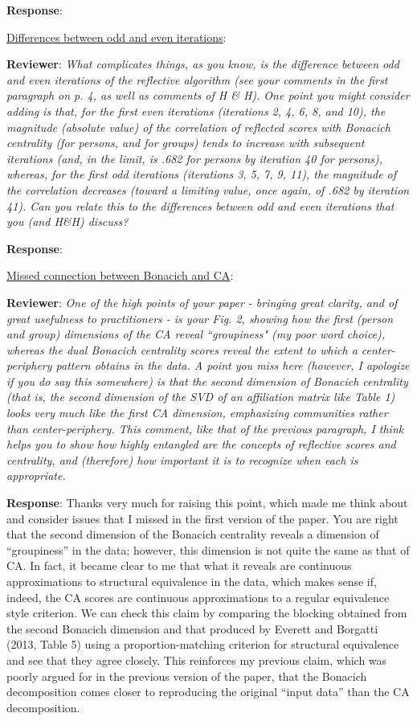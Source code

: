 \documentclass{article}
\begin{document}
\textbf{Response}:

\underline{Differences between odd and even iterations}:

\textbf{Reviewer}: \textit{What complicates things, as you know, is the difference between odd and even iterations of the reflective algorithm (see your comments in the first paragraph on p. 4, as well as comments of H \& H). One point you might consider adding is that, for the first even iterations (iterations 2, 4, 6, 8, and 10), the magnitude (absolute value) of the correlation of reflected scores with Bonacich centrality (for persons, and for groups) tends to increase with subsequent iterations (and, in the limit, is .682 for persons by iteration 40 for persons), whereas, for the first odd iterations (iterations 3, 5, 7, 9, 11), the magnitude of the correlation decreases (toward a limiting value, once again, of .682 by iteration 41). Can you relate this to the differences between odd and even iterations that you (and H\&H) discuss?}

\textbf{Response}:

\underline{Missed connection between Bonacich and CA}:

\textbf{Reviewer}: \textit{One of the high points of your paper - bringing great clarity, and of great usefulness to practitioners - is your Fig. 2, showing how the first (person and group) dimensions of the CA reveal ``groupiness" (my poor word choice), whereas the dual Bonacich centrality scores reveal the extent to which a center-periphery pattern obtains in the data. A point you miss here (however, I apologize if you do say this somewhere) is that the second dimension of Bonacich centrality (that is, the second dimension of the SVD of an affiliation matrix like Table 1) looks very much like the first CA dimension, emphasizing communities rather than center-periphery. This comment, like that of the previous paragraph, I think helps you to show how highly entangled are the concepts of reflective scores and centrality, and (therefore) how important it is to recognize when each is appropriate.}

\textbf{Response}: Thanks very much for raising this point, which made me think about and consider issues that I missed in the first version of the paper. You are right that the second dimension of the Bonacich centrality reveals a dimension of ``groupiness'' in the data; however, this dimension is not quite the same as that of CA. In fact, it became clear to me that what it reveals are continuous approximations to structural equivalence in the data, which makes sense if, indeed, the CA scores are continuous approximations to a regular equivalence style criterion. We can check this claim by comparing the blocking obtained from the second Bonacich dimension and that produced by Everett and Borgatti (2013, Table 5) using a proportion-matching criterion for structural equivalence and see that they agree closely. This reinforces my previous claim, which was poorly argued for in the previous version of the paper, that the Bonacich decomposition comes closer to reproducing the original ``input data'' than the CA decomposition. 
\end{document}
